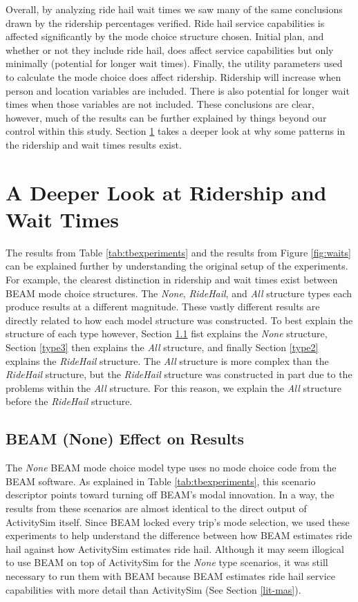 \documentclass[12pt, oneside, openright]{byuthesis}
\begin{document}
Overall, by analyzing ride hail wait times we saw many of the same conclusions drawn by the ridership percentages verified. Ride hail service capabilities is affected significantly by the mode choice structure chosen. Initial plan, and whether or not they include ride hail, does affect service capabilities but only minimally (potential for longer wait times). Finally, the utility parameters used to calculate the mode choice does affect ridership. Ridership will increase when person and location variables are included. There is also potential for longer wait times when those variables are not included. These conclusions are clear, however, much of the results can be further explained by things beyond our control within this study. Section \ref{deep-look} takes a deeper look at why some patterns in the ridership and wait times results exist.

\hypertarget{deep-look}{%
\section{A Deeper Look at Ridership and Wait Times}\label{deep-look}}

The results from Table \ref{tab:tbexperiments} and the results from Figure \ref{fig:waits} can be explained further by understanding the original setup of the experiments. For example, the clearest distinction in ridership and wait times exist between BEAM mode choice structures. The \emph{None}, \emph{RideHail}, and \emph{All} structure types each produce results at a different magnitude. These vastly different results are directly related to how each model structure was constructed. To best explain the structure of each type however, Section \ref{type1} fist explains the \emph{None} structure, Section \ref{type3} then explains the \emph{All} structure, and finally Section \ref{type2} explains the \emph{RideHail} structure. The \emph{All} structure is more complex than the \emph{RideHail} structure, but the \emph{RideHail} structure was constructed in part due to the problems within the \emph{All} structure. For this reason, we explain the \emph{All} structure before the \emph{RideHail} structure.

\hypertarget{type1}{%
\subsection{BEAM (None) Effect on Results}\label{type1}}

The \emph{None} BEAM mode choice model type uses no mode choice code from the BEAM software. As explained in Table \ref{tab:tbexperiments}, this scenario descriptor points toward turning off BEAM's modal innovation. In a way, the results from these scenarios are almost identical to the direct output of ActivitySim itself. Since BEAM locked every trip's mode selection, we used these experiments to help understand the difference between how BEAM estimates ride hail against how ActivitySim estimates ride hail. Although it may seem illogical to use BEAM on top of ActivitySim for the \emph{None} type scenarios, it was still necessary to run them with BEAM because BEAM estimates ride hail service capabilities with more detail than ActivitySim (See Section \ref{lit-mas}).
\end{document}
